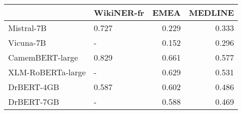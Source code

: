 \begin{tabular}{llrr}
\toprule
 & WikiNER-fr & EMEA & MEDLINE \\
\midrule
Mistral-7B & 0.727 & 0.229 & 0.333 \\
Vicuna-7B & - & 0.152 & 0.296 \\
CamemBERT-large & 0.829 & 0.661 & 0.577 \\
XLM-RoBERTa-large & - & 0.629 & 0.531 \\
DrBERT-4GB & 0.587 & 0.602 & 0.486 \\
DrBERT-7GB & - & 0.588 & 0.469 \\
\bottomrule
\end{tabular}

